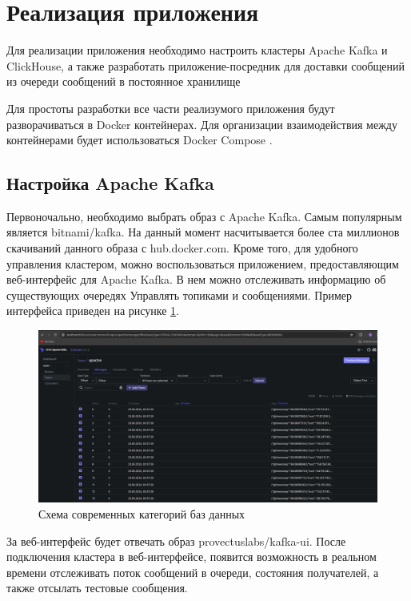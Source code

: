 \documentclass[14pt, russian]{scrartcl}
\begin{document}
\section{Реализация приложения}

Для реализации приложения
необходимо настроить
кластеры Apache Kafka
и ClickHouse, а также
разработать приложение-посредник
для доставки сообщений из очереди
сообщений в постоянное хранилище


Для простоты разработки все части
реализумого приложения будут разворачиваться
в Docker \cite{DockerDocs} контейнерах. Для организации
взаимодействия между контейнерами будет
использоваться Docker Compose \cite{DockerComposeDocs}.

\subsection{Настройка Apache Kafka}

Первоночально, необходимо выбрать образ с Apache Kafka.
Самым популярным является bitnami/kafka. На данный
момент насчитывается более ста миллионов скачиваний данного образа
с hub.docker.com. Кроме того, для удобного
управления кластером, можно воспользоваться
приложением, предоставляющим веб-интерфейс для
Apache Kafka. В нем можно отслеживать информацию об существующих очередях
Управлять топиками и сообщениями. Пример интерфейса приведен на рисунке \ref{fig:kafkaui}.

\begin{figure}[H]
	\centering
	\begin{minipage}[t]{.9\textwidth}
		\centering
		\includegraphics[width=.7\textwidth]{./imgs/kafkaui.png}
	\end{minipage}
	\caption{Схема современных категорий баз данных}
	\label{fig:kafkaui}
\end{figure}

За веб-интерфейс будет отвечать образ provectuslabs/kafka-ui.
После подключения кластера в веб-интерфейсе, появится возможность
в реальном времени отслеживать поток сообщений в очереди,
состояния получателей, а также отсылать тестовые сообщения.
\end{document}
